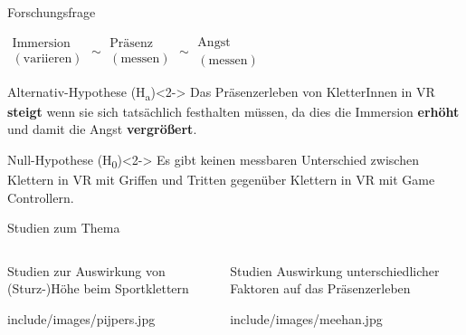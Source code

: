 \begin{frame}{Forschungsfrage}
\begin{center}
	\LARGE
	$\substack{\text{Immersion}\\(\text{variieren})} \sim \substack{\text{Präsenz}\\(\text{messen})} \sim \substack{\text{Angst}\\(\text{messen})}$
\end{center}
\begin{center}
	\begin{minipage}{0.7\textwidth}
		\begin{block}{Alternativ-Hypothese (H\textsubscript{a}\label{hyp:anxiety})}<2->
			Das \textcolor{tracker}{Präsenz}erleben von KletterInnen in \gls{VR} \textbf{steigt} wenn sie sich tatsächlich festhalten müssen, da dies die \textcolor{tracker}{Immersion} \textbf{erhöht} und damit die \textcolor{tracker}{Angst} \textbf{vergrößert}.
		\end{block}
		\begin{block}{Null-Hypothese (H\textsubscript{0}\label{hyp:anxiety})}<2->
			Es gibt keinen messbaren Unterschied zwischen Klettern in \gls{VR} mit \textcolor{tracker}{Griffen und Tritten} gegenüber Klettern in \gls{VR} mit \textcolor{tracker}{Game Controllern}.
		\end{block}
	\end{minipage}
\end{center}
\end{frame}

\begin{frame}{Studien zum Thema}
\begin{columns}
	\begin{column}{0.5\textwidth}
		Studien zur Auswirkung von (Sturz-)Höhe beim Sportklettern
		\autocites{Hardy2007}{Pijpers2006,Pijpers2005,Pijpers2003}
		\begin{center}
			\begin{overpic}[height=0.555\textheight]{include/images/pijpers.jpg}
			\end{overpic}
		\end{center}
	\end{column}
	\begin{column}{0.5\textwidth}
		Studien Auswirkung unterschiedlicher Faktoren auf das Präsenzerleben
		\autocite{Meehan2002,Meehan2001}
		\begin{center}
			\begin{overpic}[height=0.6\textheight]{include/images/meehan.jpg}
			\end{overpic}
		\end{center}
		\vfill
	\end{column}
\end{columns}
\end{frame}

